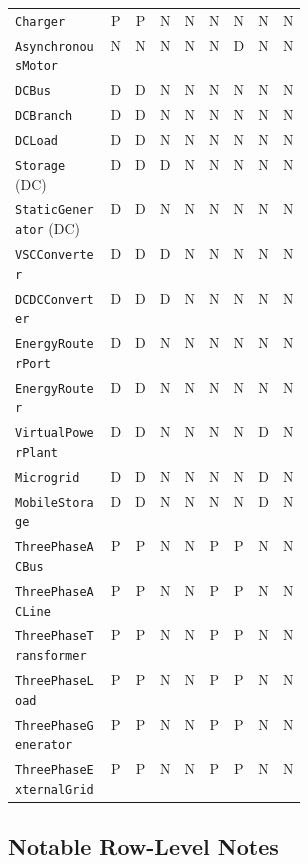\begin{longtable}{L{0.34\linewidth}cccccccc}
\texttt{Charger} & P & P & N & N & N & N & N & N \\
\texttt{AsynchronousMotor} & N & N & N & N & N & D & N & N \\
\texttt{DCBus} & D & D & N & N & N & N & N & N \\
\texttt{DCBranch} & D & D & N & N & N & N & N & N \\
\texttt{DCLoad} & D & D & N & N & N & N & N & N \\
\texttt{Storage} (DC) & D & D & D & N & N & N & N & N \\
\texttt{StaticGenerator} (DC) & D & D & N & N & N & N & N & N \\
\texttt{VSCConverter} & D & D & D & N & N & N & N & N \\
\texttt{DCDCConverter} & D & D & D & N & N & N & N & N \\
\texttt{EnergyRouterPort} & D & D & N & N & N & N & N & N \\
\texttt{EnergyRouter} & D & D & N & N & N & N & N & N \\
\texttt{VirtualPowerPlant} & D & D & N & N & N & N & D & N \\
\texttt{Microgrid} & D & D & N & N & N & N & D & N \\
\texttt{MobileStorage} & D & D & N & N & N & N & D & N \\
\texttt{ThreePhaseACBus} & P & P & N & N & P & P & N & N \\
\texttt{ThreePhaseACLine} & P & P & N & N & P & P & N & N \\
\texttt{ThreePhaseTransformer} & P & P & N & N & P & P & N & N \\
\texttt{ThreePhaseLoad} & P & P & N & N & P & P & N & N \\
\texttt{ThreePhaseGenerator} & P & P & N & N & P & P & N & N \\
\texttt{ThreePhaseExternalGrid} & P & P & N & N & P & P & N & N \\
\bottomrule
\end{longtable}
\normalsize

\subsection{Notable Row-Level Notes}


